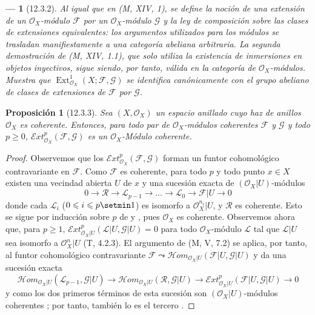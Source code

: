 \documentclass[10pt,oneside,openany]{book}
\theoremstyle{egaenv}\newtheorem*{env}{---}
\theoremstyle{egastatement}
\newtheorem*{proposition}{Proposición}
\theoremstyle{egadescription}
\renewcommand{\leq}{\leqslant}
\renewcommand{\geq}{\geqslant}
\begin{document}
\begin{env}[12.3.2]
\label{0.12.3.2}
\label{0.12.3.2-fr}
Al igual que en (M, XIV, 1), se define la noción de una
\emph{extensión} de un $\mathcal O_X$-módulo $\mathcal F$ por un
$\mathcal O_X$-módulo $\mathcal G$ y la ley de composición sobre las clases de
extensiones equivalentes: los argumentos utilizados para los módulos se
trasladan manifiestamente a una categoría abeliana arbitraria.
La segunda demostración de (M, XIV, 1.1), que solo utiliza la existencia de
inmersiones en objetos inyectivos, sigue siendo, por tanto, válida en la
categoría de $\mathcal O_X$-módulos.  Muestra que
$\operatorname{Ext}_{\mathcal O_X}^1(X;\mathcal F,\mathcal G)$
se identifica canónicamente con el \emph{grupo abeliano de clases de
extensiones de $\mathcal F$ por $\mathcal G$}.
\end{env}

\begin{proposition}[12.3.3]
\label{0.12.3.3}
\label{0.12.3.3-fr}
Sea $(X,\mathcal O_X)$ un espacio anillado cuyo haz de anillos
$\mathcal O_X$ es coherente.
Entonces, para todo par de $\mathcal O_X$-módulos coherentes $\mathcal F$ y
$\mathcal G$ y todo $p\geq0$,
$\mathcal{E}xt_{\mathcal O_X}^p(\mathcal F,\mathcal G)$
es un $\mathcal O_X$-Módulo coherente.
\end{proposition}

\begin{proof}
Observemos que los $\mathcal{E}xt_{\mathcal O_X}^p(\mathcal F,\mathcal G)$ forman un funtor cohomológico
contravariante en $\mathcal F$.
Como $\mathcal F$ es coherente, para todo $p$ y todo punto $x\in X$
existen una vecindad abierta $U$ de $x$ y una sucesión exacta de $(\mathcal O_X|U)$-módulos
\[
0\longrightarrow\mathcal R\longrightarrow\mathcal L_{p-1}
\longrightarrow\ldots\longrightarrow\mathcal L_0
\longrightarrow\mathcal F|U\longrightarrow0
\]
donde cada $\mathcal L_i$ ($0\leq i\leq p\setmin 1$) es isomorfo a
$\mathcal O_X^{n_i}|U$, y $\mathcal R$ es coherente.
Esto se sigue por inducción sobre $p$ de
 y
, pues $\mathcal O_X$ es coherente. Observemos ahora que, para $p\geq1$,
$\mathcal{E}xt_{\mathcal O_X|U}^p(\mathcal L|U,\mathcal G|U)=0$
para todo $\mathcal O_X$-módulo $\mathcal L$ tal que $\mathcal L|U$ sea
isomorfo a $\mathcal O_X^n|U$ (T, 4.2.3).
El argumento de (M, V, 7.2) se aplica, por tanto, al funtor cohomológico
contravariante
$\mathcal F\leadsto
\mathcal{H}om_{\mathcal O_X|U}(\mathcal F|U,\mathcal G|U)$
y da una sucesión exacta
\[
\mathcal{H}om_{\mathcal O_X|U}(\mathcal L_{p-1},\mathcal G|U)
\longrightarrow
\mathcal{H}om_{\mathcal O_X|U}(\mathcal R,\mathcal G|U)
\longrightarrow
\mathcal{E}xt_{\mathcal O_X|U}^p(\mathcal F|U,\mathcal G|U)
\longrightarrow0
\] y como los dos primeros términos de esta sucesión son $(\mathcal O_X|U)$-módulos coherentes
; por tanto, también lo es el tercero
.
\end{proof}
\end{document}
